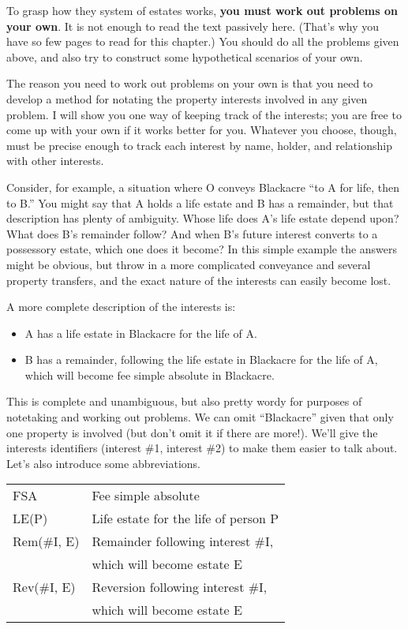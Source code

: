 To grasp how they system of estates works, \textbf{you must work out problems on
your own}. It is not enough to read the text passively here. (That's why you
have so few pages to read for this chapter.) You should do all the problems
given above, and also try to construct some hypothetical scenarios of your own.

The reason you need to work out problems on your own is that you need to develop
a method for notating the property interests involved in any given problem. I
will show you one way of keeping track of the interests; you are free to come up
with your own if it works better for you. Whatever you choose, though, must be
precise enough to track each interest by name, holder, and relationship with
other interests.

Consider, for example, a situation where O conveys Blackacre ``to A for life,
then to B.'' You might say that A holds a life estate and B has a remainder, but
that description has plenty of ambiguity. Whose life does A's life estate depend
upon? What does B's remainder follow? And when B's future interest converts to a
possessory estate, which one does it become? In this simple example the answers
might be obvious, but throw in a more complicated conveyance and several
property transfers, and the exact nature of the interests can easily become
lost.

A more complete description of the interests is:
\begin{itemize}
\item A has a life estate in Blackacre for the life of A.
\item B has a remainder, following the life estate in Blackacre for
the life of A, which will become fee simple absolute in Blackacre.
\end{itemize}
This is complete and unambiguous, but also pretty wordy for purposes of
notetaking and working out problems. We can omit ``Blackacre'' given that only
one property is involved (but don't omit it if there are more!). We'll give the
interests identifiers (interest \#1, interest \#2) to make them easier to talk
about. Let's also introduce some abbreviations.
\begin{center}
\begin{tabular}{ll}
FSA & Fee simple absolute \\
LE(P) & Life estate for the life of person P \\
Rem(\#I, E) & Remainder following interest \#I, \\
 & which will become estate E \\
Rev(\#I, E) & Reversion following interest \#I, \\
 & which will become estate E \\
\end{tabular}
\end{center}

